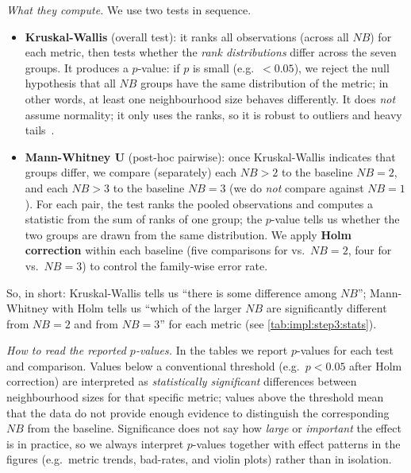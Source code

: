 \textit{What they compute.}
We use two tests in sequence.
\begin{itemize}
  \item \textbf{Kruskal-Wallis} (overall test): it ranks all observations (across all \(NB\)) for each metric, then tests whether the \emph{rank distributions} differ across the seven groups.
  It produces a \(p\)-value: if \(p\) is small (e.g.\ \(<0.05\)), we reject the null hypothesis that all \(NB\) groups have the same distribution of the metric; in other words, at least one neighbourhood size behaves differently.
  It does \emph{not} assume normality; it only uses the ranks, so it is robust to outliers and heavy tails~\cite{gibbons_chakraborti2020}.
  \item \textbf{Mann-Whitney U} (post-hoc pairwise): once Kruskal-Wallis indicates that groups differ, we compare (separately) each \(NB>2\) to the baseline \(NB=2\), and each \(NB>3\) to the baseline \(NB=3\) (we do \emph{not} compare against \(NB=1\)).
  For each pair, the test ranks the pooled observations and computes a statistic from the sum of ranks of one group; the \(p\)-value tells us whether the two groups are drawn from the same distribution.
  We apply \textbf{Holm correction} within each baseline (five comparisons for vs.\ \(NB=2\), four for vs.\ \(NB=3\)) to control the family-wise error rate.
\end{itemize}
So, in short: Kruskal-Wallis tells us ``there is some difference among \(NB\)''; Mann-Whitney with Holm tells us ``which of the larger \(NB\) are significantly different from \(NB=2\) and from \(NB=3\)'' for each metric (see \cref{tab:impl:step3:stats}).

\textit{How to read the reported \(p\)-values.}
In the tables we report \(p\)-values for each test and comparison.
Values below a conventional threshold (e.g.\ \(p<0.05\) after Holm correction) are interpreted as \emph{statistically significant} differences between neighbourhood sizes for that specific metric; values above the threshold mean that the data do not provide enough evidence to distinguish the corresponding \(NB\) from the baseline.
Significance does not say how \emph{large} or \emph{important} the effect is in practice, so we always interpret \(p\)-values together with effect patterns in the figures (e.g.\ metric trends, bad-rates, and violin plots) rather than in isolation.

